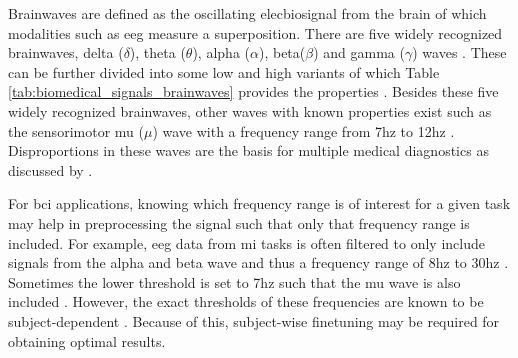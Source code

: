 Brainwaves are defined as the oscillating \gls{elecbiosignal} from the brain of which modalities such as \gls{eeg} measure a superposition.
There are five widely recognized brainwaves, delta ($\delta$), theta ($\theta$), alpha ($\alpha$), beta($\beta$) and gamma ($\gamma$) waves \citep{book_eeg_emotion_recognition}.
These can be further divided into some low and high variants of which Table \ref{tab:biomedical_signals_brainwaves} provides the properties \citep{fifty_year_bci_review}.
Besides these five widely recognized brainwaves, other waves with known properties exist such as the sensorimotor mu ($\mu$) wave with a frequency range from 7\gls{hz} to 12\gls{hz} \citep{mu_waves}.
Disproportions in these waves are the basis for multiple medical diagnostics as discussed by \citet{fifty_year_bci_review}.

For \gls{bci} applications, knowing which frequency range is of interest for a given task may help in preprocessing the signal such that only that frequency range is included.
For example, \gls{eeg} data from \gls{mi} tasks is often filtered to only include signals from the alpha and beta wave and thus a frequency range of 8\gls{hz} to 30\gls{hz} \citep{mi_range}.
Sometimes the lower threshold is set to 7\gls{hz} such that the mu wave is also included \citep{mu_waves}.
However, the exact thresholds of these frequencies are known to be subject-dependent \citep{mu_waves}.
Because of this, subject-wise finetuning may be required for obtaining optimal results.


